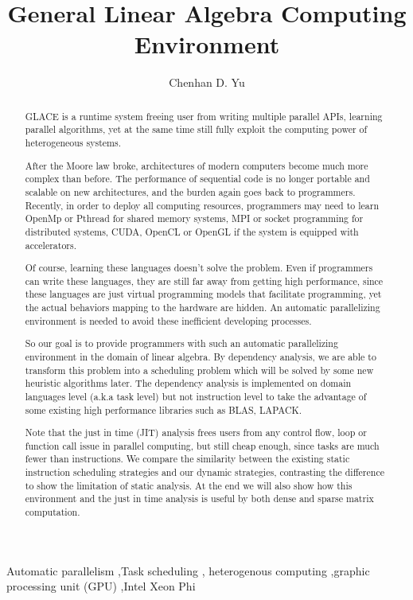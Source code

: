 \documentclass[preprint,11pt]{elsarticle}
\begin{document}
\begin{frontmatter}
  \title{General Linear Algebra Computing Environment}
  \author[a01]{Chenhan D. Yu} 
  \address[a01]{Department of Computer Science, University of Texas at Austin}

  \begin{abstract}
  GLACE is a runtime system freeing user from writing multiple parallel APIs, 
  learning parallel algorithms, yet at the same time still fully exploit the computing power 
  of heterogeneous systems.
  
  
  After the Moore law broke, architectures of modern computers become much more 
  complex than before. The performance of sequential code is no longer portable and 
  scalable on new architectures, and the burden again goes back to programmers. 
  Recently, in order to deploy all computing resources, programmers may need to learn 
  OpenMp or Pthread for shared memory systems, MPI or socket programming for 
  distributed systems, CUDA, OpenCL or OpenGL if the system is equipped with 
  accelerators.
  
  Of course, learning these languages doesn't solve the problem. Even if programmers can 
  write these languages, they are still far away from getting high performance, since these 
  languages are just virtual programming models that facilitate programming, yet the actual 
  behaviors mapping to the hardware are hidden. An automatic parallelizing environment is 
  needed to avoid these inefficient developing processes.
  
  So our goal is to provide programmers with such an automatic parallelizing environment 
  in the domain of linear algebra. By dependency analysis, we are able to transform this 
  problem into a scheduling problem which will be solved by some new heuristic algorithms 
  later. The dependency analysis is implemented on domain languages level (a.k.a task 
  level) but not instruction level to take the advantage of some existing high performance 
  libraries such as BLAS, LAPACK.
  
  Note that the just in time (JIT) analysis frees users from any control flow, loop or function 
  call issue in parallel computing, but still cheap enough, since tasks are much fewer than 
  instructions. We compare the similarity between the existing static instruction scheduling 
  strategies and our dynamic strategies, contrasting the difference to show the limitation of 
  static analysis. At the end we will also show how this environment and the just in time 
  analysis is useful by both dense and sparse matrix computation.
  \end{abstract}
  \begin{keyword}
    Automatic parallelism \sep Task scheduling \sep
    heterogenous computing \sep graphic processing unit (GPU) \sep Intel Xeon Phi
  \end{keyword}
\end{frontmatter}
\end{document}
